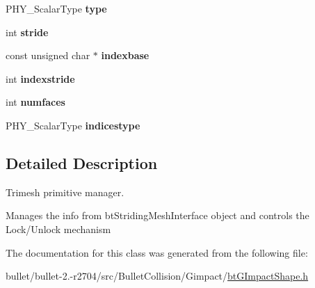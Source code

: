 \begin{DoxyCompactItemize}
\item 
\hypertarget{classbt_g_impact_mesh_shape_part_1_1_trimesh_primitive_manager_a732eca4ca085b232ba4164fb3361cf23}{P\+H\+Y\+\_\+\+Scalar\+Type {\bfseries type}}\label{classbt_g_impact_mesh_shape_part_1_1_trimesh_primitive_manager_a732eca4ca085b232ba4164fb3361cf23}

\item 
\hypertarget{classbt_g_impact_mesh_shape_part_1_1_trimesh_primitive_manager_aac08e1d058c883c2d55743b49fcfc22a}{int {\bfseries stride}}\label{classbt_g_impact_mesh_shape_part_1_1_trimesh_primitive_manager_aac08e1d058c883c2d55743b49fcfc22a}

\item 
\hypertarget{classbt_g_impact_mesh_shape_part_1_1_trimesh_primitive_manager_ad6d0d8c45a8a01cd60e11be70e92164d}{const unsigned char $\ast$ {\bfseries indexbase}}\label{classbt_g_impact_mesh_shape_part_1_1_trimesh_primitive_manager_ad6d0d8c45a8a01cd60e11be70e92164d}

\item 
\hypertarget{classbt_g_impact_mesh_shape_part_1_1_trimesh_primitive_manager_a89579bcad54eab7c6f0a2a2c333bbb86}{int {\bfseries indexstride}}\label{classbt_g_impact_mesh_shape_part_1_1_trimesh_primitive_manager_a89579bcad54eab7c6f0a2a2c333bbb86}

\item 
\hypertarget{classbt_g_impact_mesh_shape_part_1_1_trimesh_primitive_manager_a11cbf1f22ec8f970e5c6eb8da6467c70}{int {\bfseries numfaces}}\label{classbt_g_impact_mesh_shape_part_1_1_trimesh_primitive_manager_a11cbf1f22ec8f970e5c6eb8da6467c70}

\item 
\hypertarget{classbt_g_impact_mesh_shape_part_1_1_trimesh_primitive_manager_a8ac8d4c60009c6bb9f81c93b6f9d43f0}{P\+H\+Y\+\_\+\+Scalar\+Type {\bfseries indicestype}}\label{classbt_g_impact_mesh_shape_part_1_1_trimesh_primitive_manager_a8ac8d4c60009c6bb9f81c93b6f9d43f0}

\end{DoxyCompactItemize}


\subsection{Detailed Description}
Trimesh primitive manager. 

Manages the info from bt\+Striding\+Mesh\+Interface object and controls the Lock/\+Unlock mechanism 

The documentation for this class was generated from the following file\+:\begin{DoxyCompactItemize}
\item 
bullet/bullet-\/2.-\/r2704/src/\+Bullet\+Collision/\+Gimpact/\hyperlink{bt_g_impact_shape_8h}{bt\+G\+Impact\+Shape.\+h}\end{DoxyCompactItemize}
